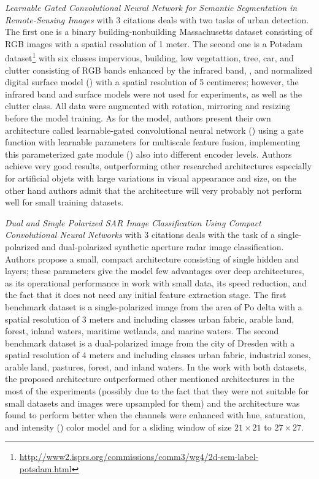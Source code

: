 \textit{Learnable Gated Convolutional Neural Network for Semantic Segmentation in Remote-Sensing Images} \cite{gated-cnn-rs} with 3  citations deals with two tasks of urban detection. The first one is a binary building-nonbuilding Massachusetts dataset \cite{massachusetts-dataset} consisting of RGB images with a spatial resolution of 1 meter. The second one is a Potsdam dataset\footnote{\url{http://www2.isprs.org/commissions/comm3/wg4/2d-sem-label-potsdam.html}} with six classes impervious, building, low vegetattion, tree, car, and clutter consisting of RGB bands enhanced by the infrared band, , and normalized digital surface model () with a spatial resolution of 5 centimeres; however, the infrared band and surface models were not used for experiments, as well as the clutter class. All data were augmented with rotation, mirroring and resizing before the model training. As for the model, authors present their own architecture called learnable-gated convolutional neural network () using a gate function with learnable parameters for multiscale feature fusion, implementing this parameterized gate module () also into different encoder levels. Authors achieve very good results, outperforming other researched architectures especially for artificial objets with large variations in visual appearance and size, on the other hand authors admit that the architecture will very probably not perform well for small training datasets.

\textit{Dual and Single Polarized SAR Image Classification Using Compact Convolutional Neural Networks} \cite{polarized-sar-cnn} with 3 citations deals with the task of a single-polarized and dual-polarized synthetic aperture radar  image classification. Authors propose a small, compact  architecture consisting of single hidden  and  layers; these parameters give the model few advantages over deep architectures, as its operational performance in work with small data, its speed reduction, and the fact that it does not need any initial feature extraction stage. The first benchmark dataset is a single-polarized  image from the area of Po delta with a spatial resolution of 3 meters and including classes urban fabric, arable land, forest, inland waters, maritime wetlands, and marine waters. The second benchmark dataset is a dual-polarized  image from the city of Dresden with a spatial resolution of 4 meters and including classes urban fabric, industrial zones, arable land, pastures, forest, and inland waters. In the work with both datasets, the proposed architecture outperformed other mentioned architectures in the most of the experiments (possibly due to the fact that they were not suitable for small datasets and images were upsampled for them) and the architecture was found to perform better when the channels were enhanced with hue, saturation, and intensity () color model and for a sliding window of size $21 \times 21$ to $27 \times 27$.

